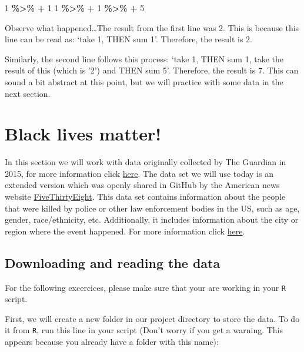 \documentclass[
]{book}
\newenvironment{Shaded}{\begin{snugshade}}{\end{snugshade}}
\newcommand{\DecValTok}[1]{\textcolor[rgb]{0.00,0.00,0.81}{#1}}
\newcommand{\SpecialCharTok}[1]{\textcolor[rgb]{0.81,0.36,0.00}{\textbf{#1}}}
\begin{document}
\begin{Shaded}
\begin{Highlighting}[]
\DecValTok{1} \SpecialCharTok{\%\textgreater{}\%} \SpecialCharTok{+} \DecValTok{1}
\DecValTok{1} \SpecialCharTok{\%\textgreater{}\%} \SpecialCharTok{+} \DecValTok{1} \SpecialCharTok{\%\textgreater{}\%} \SpecialCharTok{+} \DecValTok{5}
\end{Highlighting}
\end{Shaded}

Observe what happened\ldots The result from the first line was 2. This is because this line can be read as: `take 1, THEN sum 1'. Therefore, the result is 2.

Similarly, the second line follows this process: `take 1, THEN sum 1, take the result of this (which is '2') and THEN sum 5'. Therefore, the result is 7. This can sound a bit abstract at this point, but we will practice with some data in the next section.

\hypertarget{black-lives-matter}{%
\section{Black lives matter!}\label{black-lives-matter}}

In this section we will work with data originally collected by The Guardian in 2015, for more information click \href{https://www.theguardian.com/us-news/ng-interactive/2015/jun/01/about-the-counted}{here}. The data set we will use today is an extended version which was openly shared in GitHub by the American news website \href{https://fivethirtyeight.com/}{FiveThirtyEight}. This data set contains information about the people that were killed by police or other law enforcement bodies in the US, such as age, gender, race/ethnicity, etc. Additionally, it includes information about the city or region where the event happened. For more information click \href{https://github.com/fivethirtyeight/data/tree/master/police-killings}{here}.

\hypertarget{downloading-and-reading-the-data}{%
\subsection{Downloading and reading the data}\label{downloading-and-reading-the-data}}

For the following excercices, please make sure that your are working in your \texttt{R} script.

First, we will create a new folder in our project directory to store the data. To do it from \texttt{R}, run this line in your script (Don't worry if you get a warning. This appears because you already have a folder with this name):
\end{document}
